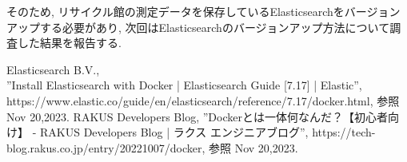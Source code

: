 \documentclass[a4j,12pt,]{jarticle}
\begin{document}
そのため, リサイクル館の測定データを保存しているElasticsearchをバージョンアップする必要があり, 次回はElasticsearchのバージョンアップ方法について調査した結果を報告する.

\begin{thebibliography}{5}
  Elasticsearch B.V.,\\ ”Install Elasticsearch with Docker | Elasticsearch Guide [7.17] | Elastic”, https://www.elastic.co/guide/en/elasticsearch/reference/7.17/docker.html, 参照 Nov 20,2023.
  RAKUS Developers Blog, ”Dockerとは一体何なんだ？【初心者向け】 - RAKUS Developers Blog | ラクス エンジニアブログ”, https://tech-blog.rakus.co.jp/entry/20221007/docker, 参照 Nov 20,2023.
\end{thebibliography}
\end{document}
